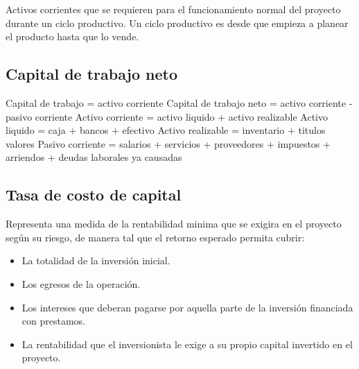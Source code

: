 \documentclass[a4paper, 11pt, oneside]{article}
\begin{document}
Activos corrientes que se requieren para el funcionamiento normal del proyecto durante un ciclo productivo. Un ciclo productivo es desde que empieza
a planear el producto hasta que lo vende.

\subsection{Capital de trabajo neto}

Capital de trabajo = activo corriente \newline
Capital de trabajo neto = activo corriente - pasivo corriente \newline
Activo corriente = activo liquido + activo realizable \newline
Activo liquido = caja + bancos + efectivo \newline
Activo realizable = inventario + titulos valores \newline
Pasivo corriente = salarios + servicios + proveedores + impuestos + arriendos + deudas laborales ya causadas \newline

\subsection{Tasa de costo de capital}

Representa una medida de la rentabilidad minima que se exigira en el proyecto según su riesgo, de manera tal que el retorno esperado permita cubrir: 

\begin{itemize}
	\item La totalidad de la inversión inicial.
	\item Los egresos de la operación.
	\item Los intereses que deberan pagarse por aquella parte de la inversión financiada con prestamos.
	\item La rentabilidad que el inversionista le exige a su propio capital invertido en el proyecto. 
\end{itemize}
\end{document}
